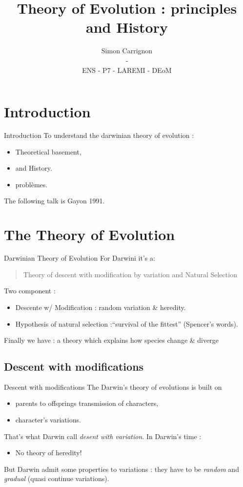 \documentclass[8pt]{beamer}
\author{Simon Carrignon\\-\\ENS - P7 - LAREMI - DEoM}
\title{Theory of Evolution : principles and History }
\begin{document}
\begin{frame}
	\titlepage
\end{frame}
\section{Introduction}
\begin{frame}{Introduction}
	To understand the darwinian theory of evolution :
	\vfill
	\begin{itemize}
		\item Theoretical basement,
		\item and History.
		\item problèmes.
	\end{itemize}
	\vfill
	The following talk is Gayon 1991.
\end{frame}

\section{The Theory of Evolution}
\begin{frame}{Darwinian Theory of Evolution}
	For Darwini it's a:
	\begin{quote}
		Theory of descent with modification by variation and Natural Selection
	\end{quote}

	\vfill

	Two component :
	\begin{itemize}
		\item Descente w/ Modification : random variation \& heredity.
		\item Hypothesis of natural selection :``survival of the fittest'' (Spencer's words).
	\end{itemize}
	\vfil
	Finally we have : a theory which explains how species change \& diverge 
\end{frame}

\subsection{Descent with modifications}
\begin{frame}{Descent with modifications}
	The Darwin's theory of evolutions is built on 
	\begin{itemize}
		\item parents to offsprings transmission of characters,  
		\item character's variations.
	\end{itemize}
	\vfil
	That's what Darwin call \emph{desent with variation}.
	\vfill 
	In Darwin's time :

\vfil
	\begin{itemize}
		\item No theory of heredity!
	\end{itemize}
	But Darwin admit some properties to variations : they have to be \emph{random} and \emph{gradual} (quasi continue variations).
\end{frame}
\end{document}
